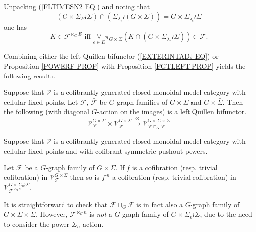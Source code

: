 \documentclass[a4paper,10pt]{article}%
\begin{document}
\begin{remark}\label{UNPACKINGLTIMES REM}
  Unpacking (\ref{FLTIMESN2 EQ}) and noting that
  \[
  \left(G \times \Sigma_E \wr \Sigma\right)
  \cap
  \left(
    \Sigma_{\lambda_e} \wr (G \times \Sigma)
  \right)
  =
  G \times \Sigma_{\lambda_e} \wr \Sigma
  \]
  one has  
  \begin{equation}\label{FLTIMESN2G EQ}
    K \in \mathcal{F}^{\ltimes_G E} 
    \text{ iff }
    \underset{e \in E}{\forall} \pi_{G \times \Sigma}
    \left(
      K \cap 
      \left(G \times \Sigma_{\lambda_e} \wr \Sigma \right)
    \right)
    \in \mathcal{F}.
  \end{equation}
\end{remark}


Combining either the left Quillen bifunctor (\ref{EXTERINTADJ EQ}) or 
Proposition \ref{POWERF PROP}
with Proposition \ref{FGTLEFT PROP} yields the following results.


\begin{proposition}\label{EXTERINTADJG PROP}
  Suppose that $\mathcal{V}$ is a cofibrantly generated closed monoidal model category with cellular fixed points.
  Let $\mathcal{F}$, $\bar{\mathcal{F}}$ be $G$-graph families of 
  $G \times \Sigma$ and $G \times \bar{\Sigma}$. Then the following (with diagonal $G$-action on the images) 
  is a left Quillen bifunctor.
  \begin{equation}\label{EXTERINTADJG EQ}
    \mathcal{V}^{G \times \Sigma}_{\mathcal{F}}
    \times
    \mathcal{V}^{G \times \bar{\Sigma}}_{\bar{\mathcal{F}}}
    \xrightarrow{\otimes}
    \mathcal{V}^{G \times \Sigma \times \bar{\Sigma}}_{
      \mathcal{F} \sqcap_G \bar{\mathcal{F}}}
  \end{equation}
\end{proposition}


\begin{proposition}\label{POWERFG PROP}
  Suppose that $\mathcal{V}$ is a cofibrantly generated closed monoidal model category with cellular fixed points and with cofibrant symmetric pushout powers.
  
  Let $\mathcal{F}$ be a $G$-graph family of $G \times \Sigma$. If $f$ is a cofibration (resp. trivial cofibration) in
  $\mathcal{V}^{G \times \Sigma}_{\mathcal{F}}$
  then so is $f^{\square n}$
  a cofibration (resp. trivial cofibration) in 
  $\mathcal{V}^{G \times \Sigma_n \wr \Sigma}_{\mathcal{F}^{\ltimes_{G} n}}$.
\end{proposition}


\begin{remark}
  It is straightforward to check that 
  $\mathcal{F} \sqcap_G \bar{\mathcal{F}}$
  is in fact also a $G$-graph family of $G \times \Sigma \times \bar{\Sigma}$.
  However, $\mathcal{F}^{\ltimes_G n}$ is \textit{not}
  a $G$-graph family of $G \times \Sigma_n \wr \Sigma$,
  due to the need to consider the power $\Sigma_n$-action.
\end{remark}
\end{document}
